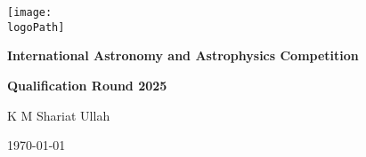 \documentclass[12pt]{article}
\newcommand{\participantName}{K M Shariat Ullah} %
\newcommand{\logoPath}{figures/logo_black_small.png}
\begin{document}
\begin{titlepage}
    \centering
    \vspace*{2cm}
    \texttt{[image: \\logoPath]}\par\vspace{1cm}
    {\large\bfseries International Astronomy and Astrophysics Competition\par}
    {\Large\bfseries Qualification Round 2025\par}
    \vspace{2cm}
    {\LARGE\participantName\par}
    \vfill
    \vspace{2cm}
    {\large \today\par}
\end{titlepage}






\end{document}
